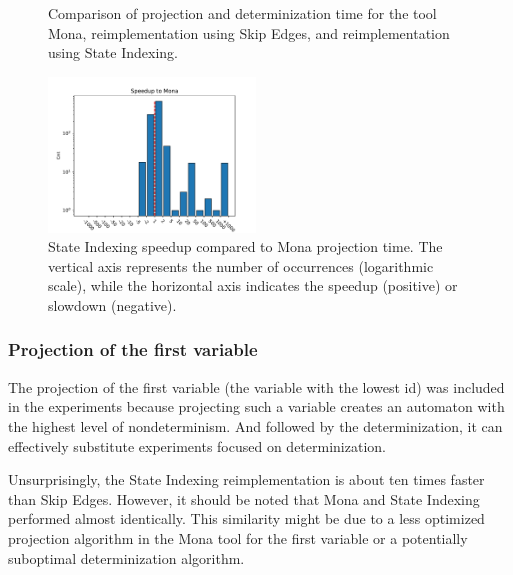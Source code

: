 \documentclass[pdflatex,sn-mathphys-num]{sn-jnl}%
\theoremstyle{thmstyleone}%
\theoremstyle{thmstyletwo}%
\theoremstyle{thmstylethree}%
\begin{document}
\begin{figure}[h!]
\begin{subfigure}{0.49\textwidth}
                \end{subfigure}
                \caption{Comparison of projection and determinization time for the tool Mona, reimplementation using Skip Edges, and reimplementation using State Indexing.}
                \label{figure:projection_last}
            \end{figure}
            \begin{figure}[h!]
                \centering
                \includegraphics[width=0.49\textwidth]{Figures/projection-last-speedup.pdf}
                \caption{State Indexing speedup compared to Mona projection time. The vertical axis represents the number of occurrences (logarithmic scale), while the horizontal axis indicates the speedup (positive) or slowdown (negative).}
                \label{figure:projection_last_speedup}
            \end{figure}
        \subsubsection*{Projection of the first variable}
            The projection of the first variable (the variable with the lowest id) was included in the experiments because projecting such a variable creates an automaton with the highest level of nondeterminism. And followed by the determinization, it can effectively substitute experiments focused on determinization.

            Unsurprisingly, the State Indexing reimplementation is about ten times faster than Skip Edges. However, it should be noted that Mona and State Indexing performed almost identically. This similarity might be due to a less optimized projection algorithm in the Mona tool for the first variable or a potentially suboptimal determinization algorithm.

            \newpage
\end{document}
